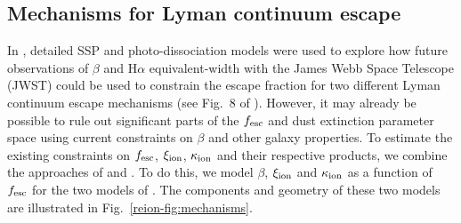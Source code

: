 \subsection{Mechanisms for Lyman continuum escape}\label{reion-sec:escape_mechanisms}

In \citet{Zackrisson:2013iz}, detailed SSP and photo-dissociation models were used to explore how future observations of $\beta$ and H$\alpha$ equivalent-width with the James Webb Space Telescope (JWST) could be used to constrain the escape fraction for two different Lyman continuum escape mechanisms (see Fig.~8 of \citet{Zackrisson:2013iz}). However, it may already be possible to rule out significant parts of the $f_{\rm{esc}}$ and dust extinction parameter space using current constraints on $\beta$ and other galaxy properties. To estimate the existing constraints on $f_{\rm{esc}}$, $\xi_{\rm{ion}}$, $\kappa_{\rm{ion}}$ and their respective products, we combine the approaches of \citet{Zackrisson:2013iz} and \citet{2010Natur.468...49R, Robertson:2013ji}. To do this, we model $\beta$, $\xi_{\rm{ion}}$ and $\kappa_{\rm{ion}}$ as a function of $f_{\rm{esc}}$ for the two models of \citet{Zackrisson:2013iz}. The components and geometry of these two models are illustrated in Fig.~\ref{reion-fig:mechanisms}.

